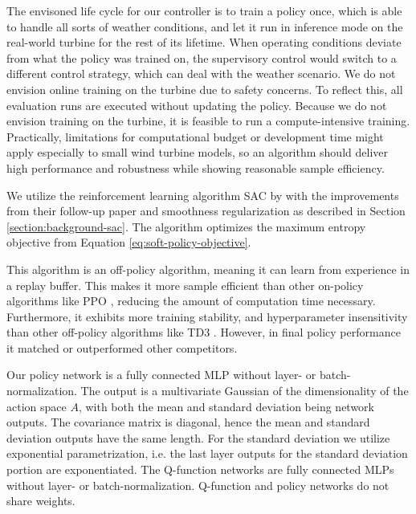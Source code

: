 The envisoned life cycle for our controller is to train a policy once, which is able to handle all sorts of weather conditions, and let it run in inference mode on the real-world turbine for the rest of its lifetime. When operating conditions deviate from what the policy was trained on, the supervisory control would switch to a different control strategy, which can deal with the weather scenario. We do not envision online training on the turbine due to safety concerns. To reflect this, all evaluation runs are executed without updating the policy. Because we do not envision training on the turbine, it is feasible to run a compute-intensive training. Practically, limitations for computational budget or development time might apply especially to small wind turbine models, so an algorithm should deliver high performance and robustness while showing reasonable sample efficiency.

We utilize the reinforcement learning algorithm \acl{SAC} by \citet{haarnojaSoftActorCriticOffPolicy2018} with the improvements from their follow-up paper \cite{haarnojaSoftActorCriticAlgorithms2019} and smoothness regularization \cite{mysoreRegularizingActionPolicies2021} as described in Section \ref{section:background-sac}. The algorithm optimizes the maximum entropy objective from Equation \ref{eq:soft-policy-objective}. 

This algorithm is an off-policy algorithm, meaning it can learn from experience in a replay buffer. This makes it more sample efficient than other on-policy algorithms like \ac{PPO} \cite{schulmanProximalPolicyOptimization2017}, reducing the amount of computation time necessary. Furthermore, it exhibits more training stability, and hyperparameter insensitivity than other off-policy algorithms like \ac{TD3} \cite{fujimotoAddressingFunctionApproximation2018}. However, in final policy performance it matched or outperformed other competitors. 

Our policy network is a fully connected \ac{MLP} without layer- or batch-normalization. The output is a multivariate Gaussian of the dimensionality of the action space $A$, with both the mean and standard deviation being network outputs. The covariance matrix is diagonal, hence the mean and standard deviation outputs have the same length. For the standard deviation we utilize exponential parametrization, i.e. the last layer outputs for the standard deviation portion are exponentiated. The Q-function networks are fully connected \acp{MLP} without layer- or batch-normalization. Q-function and policy networks do not share weights.

